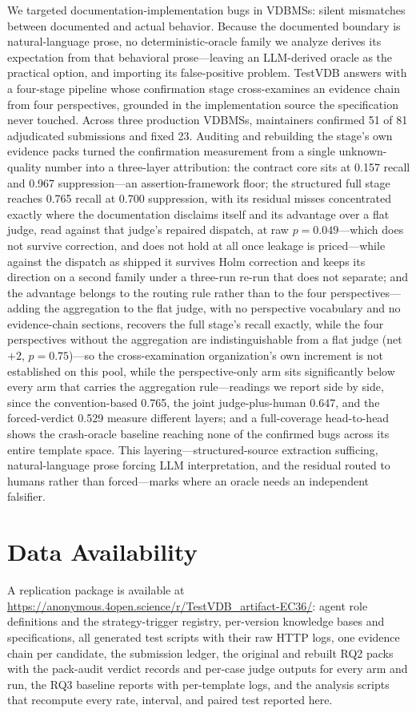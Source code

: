 \documentclass[acmsmall,screen,review,anonymous]{acmart}
\newcommand{\system}{TestVDB}
\begin{document}
We targeted documentation-implementation bugs in VDBMSs: silent mismatches between documented and actual behavior. Because the documented boundary is natural-language prose, no deterministic-oracle family we analyze derives its expectation from that behavioral prose---leaving an LLM-derived oracle as the practical option, and importing its false-positive problem. \system{} answers with a four-stage pipeline whose confirmation stage cross-examines an evidence chain from four perspectives, grounded in the implementation source the specification never touched. Across three production VDBMSs, maintainers confirmed 51 of 81 adjudicated submissions and fixed 23. Auditing and rebuilding the stage's own evidence packs turned the confirmation measurement from a single unknown-quality number into a three-layer attribution: the contract core sits at 0.157 recall and 0.967 suppression---an assertion-framework floor; the structured full stage reaches 0.765 recall at 0.700 suppression, with its residual misses concentrated exactly where the documentation disclaims itself and its advantage over a flat judge, read against that judge's repaired dispatch, at raw $p{=}0.049$---which does not survive correction, and does not hold at all once leakage is priced---while against the dispatch as shipped it survives Holm correction and keeps its direction on a second family under a three-run re-run that does not separate; and the advantage belongs to the routing rule rather than to the four perspectives---adding the aggregation to the flat judge, with no perspective vocabulary and no evidence-chain sections, recovers the full stage's recall exactly, while the four perspectives without the aggregation are indistinguishable from a flat judge (net $+2$, $p{=}0.75$)---so the cross-examination organization's own increment is not established on this pool, while the perspective-only arm sits significantly below every arm that carries the aggregation rule---readings we report side by side, since the convention-based 0.765, the joint judge-plus-human 0.647, and the forced-verdict 0.529 measure different layers; and a full-coverage head-to-head shows the crash-oracle baseline reaching none of the confirmed bugs across its entire template space. This layering---structured-source extraction sufficing, natural-language prose forcing LLM interpretation, and the residual routed to humans rather than forced---marks where an oracle needs an independent falsifier.

\section*{Data Availability}
A replication package is available at \url{https://anonymous.4open.science/r/TestVDB_artifact-EC36/}: agent role definitions and the strategy-trigger registry, per-version knowledge bases and specifications, all generated test scripts with their raw HTTP logs, one evidence chain per candidate, the submission ledger, the original and rebuilt RQ2 packs with the pack-audit verdict records and per-case judge outputs for every arm and run, the RQ3 baseline reports with per-template logs, and the analysis scripts that recompute every rate, interval, and paired test reported here.
\end{document}

